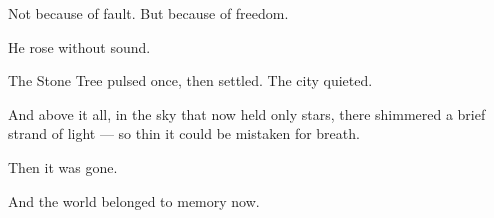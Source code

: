 \documentclass[11pt]{article}
\begin{document}
Not because of fault.  
But because of freedom.

He rose without sound.

The Stone Tree pulsed once, then settled.  
The city quieted.

And above it all, in the sky that now held only stars, there shimmered a brief strand of light — so thin it could be mistaken for breath.

Then it was gone.

And the world belonged to memory now.
\end{document}
